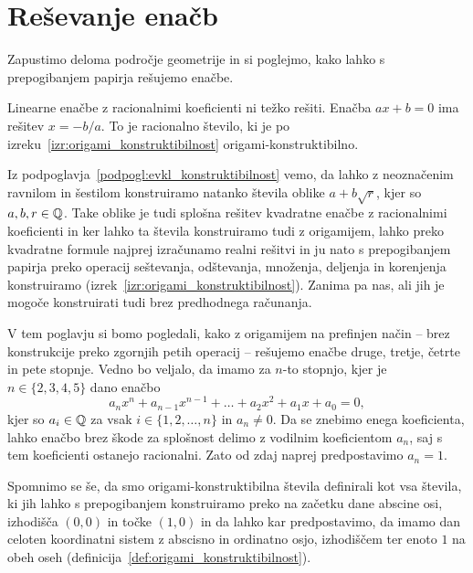 \section{Reševanje enačb}
\label{pogl:enacbe}



Zapustimo deloma področje geometrije in si poglejmo, kako lahko s prepogibanjem papirja rešujemo enačbe.

Linearne enačbe z racionalnimi koeficienti ni težko rešiti. Enačba $ax + b = 0$ ima rešitev $x = -b/a$. To je racionalno število, ki je po izreku~\ref{izr:origami_konstruktibilnost} origami-konstruktibilno.

Iz podpoglavja~\ref{podpogl:evkl_konstruktibilnost} vemo, da lahko z neoznačenim ravnilom in šestilom konstruiramo natanko števila oblike $a + b\sqrt{r}$, kjer so $a, b, r \in \mathbb Q$. Take oblike je tudi splošna rešitev kvadratne enačbe z racionalnimi koeficienti in ker lahko ta števila konstruiramo tudi z origamijem, lahko preko kvadratne formule najprej izračunamo realni rešitvi in ju nato s prepogibanjem papirja preko operacij seštevanja, odštevanja, množenja, deljenja in korenjenja konstruiramo (izrek~\ref{izr:origami_konstruktibilnost}). Zanima pa nas, ali jih je mogoče konstruirati tudi brez predhodnega računanja.

V tem poglavju si bomo pogledali, kako z origamijem na prefinjen način -- brez konstrukcije preko zgornjih petih operacij -- rešujemo enačbe druge, tretje, četrte in pete stopnje. Vedno bo veljalo, da imamo za $n$-to stopnjo, kjer je $n \in \{2, 3, 4, 5\}$ dano enačbo
$$ a_n x^n + a_{n-1} x^{n-1} + \ldots + a_2 x^2 + a_1 x + a_0 = 0, $$
kjer so $a_i \in \mathbb Q$ za vsak $i \in \{1, 2, \ldots, n\}$ in $a_n \ne 0$. Da se znebimo enega koeficienta, lahko enačbo brez škode za splošnost delimo z vodilnim koeficientom $a_n$, saj s tem koeficienti ostanejo racionalni. Zato od zdaj naprej predpostavimo $a_n = 1$.

Spomnimo se še, da smo origami-konstruktibilna števila definirali kot vsa števila, ki jih lahko s prepogibanjem konstruiramo preko na začetku dane abscine osi, izhodišča $(0,0)$ in točke $(1,0)$ in da lahko kar predpostavimo, da imamo dan celoten koordinatni sistem z abscisno in ordinatno osjo, izhodiščem ter enoto $1$ na obeh oseh (definicija~\ref{def:origami_konstruktibilnost}). 


